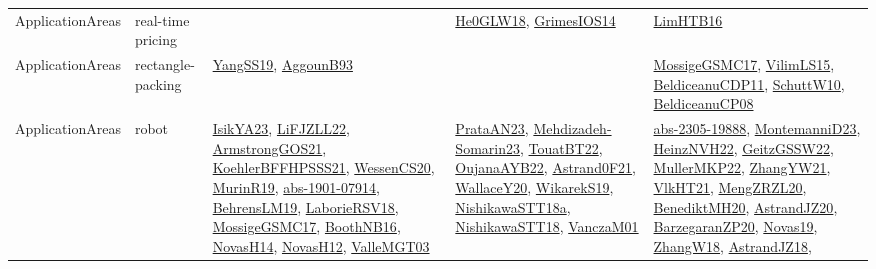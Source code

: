 {\begin{longtable}{lp{3cm}>{\raggedright}p{6cm}>{\raggedright}p{6cm}p{8cm}}
ApplicationAreas & real-time pricing &  & \href{papers/He0GLW18.pdf}{He0GLW18}\cite{He0GLW18}, \href{articles/GrimesIOS14.pdf}{GrimesIOS14}\cite{GrimesIOS14} & \href{papers/LimHTB16.pdf}{LimHTB16}\cite{LimHTB16}\\
ApplicationAreas & rectangle-packing & \href{papers/YangSS19.pdf}{YangSS19}\cite{YangSS19}, \href{articles/AggounB93.pdf}{AggounB93}\cite{AggounB93} &  & \href{papers/MossigeGSMC17.pdf}{MossigeGSMC17}\cite{MossigeGSMC17}, \href{papers/VilimLS15.pdf}{VilimLS15}\cite{VilimLS15}, \href{articles/BeldiceanuCDP11.pdf}{BeldiceanuCDP11}\cite{BeldiceanuCDP11}, \href{papers/SchuttW10.pdf}{SchuttW10}\cite{SchuttW10}, \href{papers/BeldiceanuCP08.pdf}{BeldiceanuCP08}\cite{BeldiceanuCP08}\\
ApplicationAreas & robot & \href{articles/IsikYA23.pdf}{IsikYA23}\cite{IsikYA23}, \href{papers/LiFJZLL22.pdf}{LiFJZLL22}\cite{LiFJZLL22}, \href{papers/ArmstrongGOS21.pdf}{ArmstrongGOS21}\cite{ArmstrongGOS21}, \href{articles/KoehlerBFFHPSSS21.pdf}{KoehlerBFFHPSSS21}\cite{KoehlerBFFHPSSS21}, \href{papers/WessenCS20.pdf}{WessenCS20}\cite{WessenCS20}, \href{papers/MurinR19.pdf}{MurinR19}\cite{MurinR19}, \href{articles/abs-1901-07914.pdf}{abs-1901-07914}\cite{abs-1901-07914}, \href{papers/BehrensLM19.pdf}{BehrensLM19}\cite{BehrensLM19}, \href{articles/LaborieRSV18.pdf}{LaborieRSV18}\cite{LaborieRSV18}, \href{papers/MossigeGSMC17.pdf}{MossigeGSMC17}\cite{MossigeGSMC17}, \href{papers/BoothNB16.pdf}{BoothNB16}\cite{BoothNB16}, \href{articles/NovasH14.pdf}{NovasH14}\cite{NovasH14}, \href{articles/NovasH12.pdf}{NovasH12}\cite{NovasH12}, \href{papers/ValleMGT03.pdf}{ValleMGT03}\cite{ValleMGT03} & \href{articles/PrataAN23.pdf}{PrataAN23}\cite{PrataAN23}, \href{papers/Mehdizadeh-Somarin23.pdf}{Mehdizadeh-Somarin23}\cite{Mehdizadeh-Somarin23}, \href{papers/TouatBT22.pdf}{TouatBT22}\cite{TouatBT22}, \href{papers/OujanaAYB22.pdf}{OujanaAYB22}\cite{OujanaAYB22}, \href{papers/Astrand0F21.pdf}{Astrand0F21}\cite{Astrand0F21}, \href{articles/WallaceY20.pdf}{WallaceY20}\cite{WallaceY20}, \href{articles/WikarekS19.pdf}{WikarekS19}\cite{WikarekS19}, \href{papers/NishikawaSTT18a.pdf}{NishikawaSTT18a}\cite{NishikawaSTT18a}, \href{papers/NishikawaSTT18.pdf}{NishikawaSTT18}\cite{NishikawaSTT18}, \href{papers/VanczaM01.pdf}{VanczaM01}\cite{VanczaM01} & \href{articles/abs-2305-19888.pdf}{abs-2305-19888}\cite{abs-2305-19888}, \href{articles/MontemanniD23.pdf}{MontemanniD23}\cite{MontemanniD23}, \href{articles/HeinzNVH22.pdf}{HeinzNVH22}\cite{HeinzNVH22}, \href{papers/GeitzGSSW22.pdf}{GeitzGSSW22}\cite{GeitzGSSW22}, \href{articles/MullerMKP22.pdf}{MullerMKP22}\cite{MullerMKP22}, \href{articles/ZhangYW21.pdf}{ZhangYW21}\cite{ZhangYW21}, \href{articles/VlkHT21.pdf}{VlkHT21}\cite{VlkHT21}, \href{articles/MengZRZL20.pdf}{MengZRZL20}\cite{MengZRZL20}, \href{articles/BenediktMH20.pdf}{BenediktMH20}\cite{BenediktMH20}, \href{articles/AstrandJZ20.pdf}{AstrandJZ20}\cite{AstrandJZ20}, \href{papers/BarzegaranZP20.pdf}{BarzegaranZP20}\cite{BarzegaranZP20}, \href{articles/Novas19.pdf}{Novas19}\cite{Novas19}, \href{articles/ZhangW18.pdf}{ZhangW18}\cite{ZhangW18}, \href{papers/AstrandJZ18.pdf}{AstrandJZ18}\cite{AstrandJZ18}, 
\end{longtable}}
